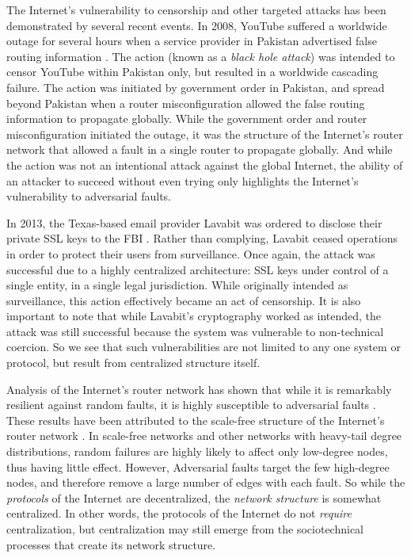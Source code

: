 \documentclass{sig-alternate-05-2015}
\begin{document}
The Internet's vulnerability to censorship and other targeted attacks
has been demonstrated by several recent events.
In 2008, YouTube suffered a worldwide outage for several hours
when a service provider in Pakistan advertised false routing information
\cite{hunter_pakistan_2008}.
The action (known as a {\em black hole attack}) was intended to censor YouTube
within Pakistan only, but resulted in a worldwide cascading failure.
The action was initiated by government order in Pakistan,
and spread beyond Pakistan when a router misconfiguration allowed the false
routing information to propagate globally.
While the government order and router misconfiguration initiated the outage,
it was the structure of the Internet's router network that allowed a fault in a
single router to propagate globally.
And while the action was not an intentional attack against the global Internet,
the ability of an attacker to succeed without even trying only highlights
the Internet's vulnerability to adversarial faults.

In 2013, the Texas-based email provider Lavabit was ordered to disclose
their private SSL keys to the FBI \cite{poulsen_edward_2013}.
Rather than complying,
Lavabit ceased operations
in order to protect their users from surveillance.
Once again, the attack was successful due to a highly centralized
architecture:
SSL keys under control of a single entity, in a single legal jurisdiction.
While originally intended as surveillance,
this action effectively became an act of censorship.
It is also important to note that while Lavabit's cryptography worked as intended,
the attack was still successful because the system was
vulnerable to non-technical coercion.
So we see that such vulnerabilities are not limited to any one system or protocol,
but result from centralized structure itself.

Analysis of the Internet's router network has shown that while it
is remarkably resilient against random faults,
it is highly susceptible to adversarial faults \cite{albert_error_2000}.
These results have been attributed to the scale-free structure of the Internet's
router network
\cite{barabasi_emergence_1999,barabasi_scale-free_2009}.
In scale-free networks and other networks with heavy-tail degree distributions,
random failures are highly likely to
affect only low-degree nodes, thus having
little effect.
However, Adversarial faults target the few high-degree nodes,
and therefore remove a large number of edges with each fault.
So while the {\em protocols} of the Internet are decentralized,
the {\em network structure} is somewhat centralized. 
In other words, the protocols of the Internet do not {\em require}
centralization, but centralization may still emerge from the sociotechnical
processes that create its network structure.
\end{document}
